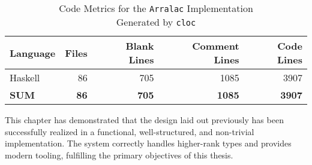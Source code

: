 \begin{table}[h!]
  \centering
  \footnotesize
  \caption{Code Metrics for the \texttt{Arralac} Implementation \\
    Generated by \texttt{cloc}}
  \begin{tabular}{lrrrr}
    \toprule
    \textbf{Language} & \textbf{Files} & \textbf{Blank Lines} & \textbf{Comment Lines} & \textbf{Code Lines} \\
    \midrule
    Haskell           & 86             & 705                  & 1085                   & 3907                \\
    \midrule
    \textbf{SUM}      & \textbf{86}    & \textbf{705}         & \textbf{1085}          & \textbf{3907}       \\
    \bottomrule
  \end{tabular}
\label{table:cloc}
\end{table}

This chapter has demonstrated that the design laid out previously has been successfully realized in a functional, well-structured, and non-trivial implementation. The system correctly handles higher-rank types and provides modern tooling, fulfilling the primary objectives of this thesis.